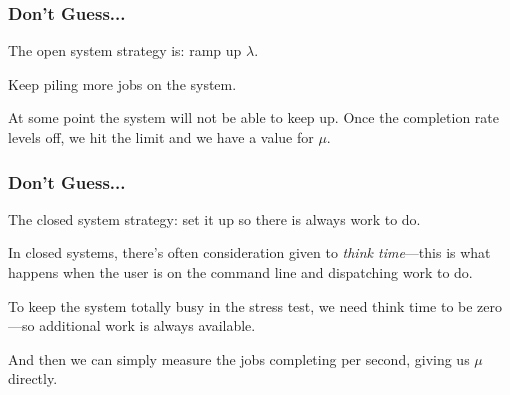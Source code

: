 \begin{frame}
\frametitle{Don't Guess...}

The open system strategy is: ramp up $\lambda$. 

Keep piling more jobs on the system. 

At some point the system will not be able to keep up. Once the completion rate levels off, we hit the limit and we have a value for $\mu$.


\end{frame}



\begin{frame}
\frametitle{Don't Guess...}

The closed system strategy: set it up so there is always work to do. 

In closed systems, there's often consideration given to \textit{think time}---this is what happens when the user is on the command line and dispatching work to do. 

To keep the system totally busy in the stress test, we need think time to be zero---so additional work is always available. 

And then we can simply measure the jobs completing per second, giving us $\mu$ directly.


\end{frame}





